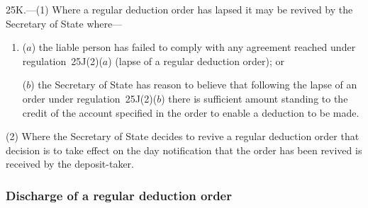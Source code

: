\documentclass[12pt,a4paper]{article}
\begin{document}
25K.---(1)  Where a regular deduction order has lapsed it may be revived by the 
Secretary of State  %
where—
\begin{enumerate}\item[]
($a$) the liable person has failed to comply with any agreement reached under regulation~25J(2)($a$)  (lapse of a regular deduction order); or

($b$) the 
Secretary of State  %
has reason to believe that following the lapse of an order under regulation~25J(2)($b$)  there is sufficient amount standing to the credit of the account specified in the order to enable a deduction to be made.
\end{enumerate}

(2) Where the 
Secretary of State  %
decides to revive a regular deduction order that decision is to take effect on the day notification that the order has been revived is received by the deposit-taker.


\subsubsection[25L. Discharge of a regular deduction order]{Discharge of a regular deduction order}
\end{document}

